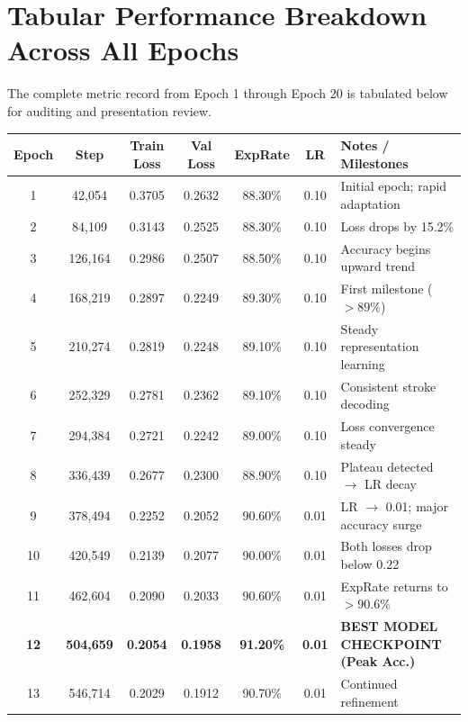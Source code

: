 \documentclass[11pt,a4paper]{article}
\begin{document}
\vspace{0.5em}

\section{Tabular Performance Breakdown Across All Epochs}
The complete metric record from Epoch 1 through Epoch 20 is tabulated below for auditing and presentation review.

\vspace{0.3em}
\begin{center}
\small
\setlength{\tabcolsep}{5pt}
\begin{tabular*}{\textwidth}{@{\extracolsep{\fill}}ccccccp{4.5cm}}
\toprule
\textbf{Epoch} & \textbf{Step} & \textbf{Train Loss} & \textbf{Val Loss} & \textbf{ExpRate} & \textbf{LR} & \textbf{Notes / Milestones} \\
\midrule
1  & 42,054  & 0.3705 & 0.2632 & 88.30\% & 0.10 & Initial epoch; rapid adaptation \\
2  & 84,109  & 0.3143 & 0.2525 & 88.30\% & 0.10 & Loss drops by 15.2\% \\
3  & 126,164 & 0.2986 & 0.2507 & 88.50\% & 0.10 & Accuracy begins upward trend \\
4  & 168,219 & 0.2897 & 0.2249 & 89.30\% & 0.10 & First milestone ($>89\%$) \\
5  & 210,274 & 0.2819 & 0.2248 & 89.10\% & 0.10 & Steady representation learning \\
6  & 252,329 & 0.2781 & 0.2362 & 89.10\% & 0.10 & Consistent stroke decoding \\
7  & 294,384 & 0.2721 & 0.2242 & 89.00\% & 0.10 & Loss convergence steady \\
8  & 336,439 & 0.2677 & 0.2300 & 88.90\% & 0.10 & Plateau detected $\to$ LR decay \\
\midrule
9  & 378,494 & 0.2252 & 0.2052 & 90.60\% & 0.01 & LR $\to$ 0.01; major accuracy surge \\
10 & 420,549 & 0.2139 & 0.2077 & 90.00\% & 0.01 & Both losses drop below 0.22 \\
11 & 462,604 & 0.2090 & 0.2033 & 90.60\% & 0.01 & ExpRate returns to $>90.6\%$ \\
\rowcolor{highlight}
\textbf{12} & \textbf{504,659} & \textbf{0.2054} & \textbf{0.1958} & \textbf{91.20\%} & \textbf{0.01} & \textbf{BEST MODEL CHECKPOINT (Peak Acc.)} \\
13 & 546,714 & 0.2029 & 0.1912 & 90.70\% & 0.01 & Continued refinement \\

\end{tabular*}
\end{center}
\end{document}
